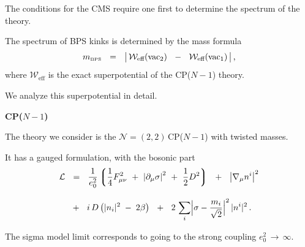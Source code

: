 \documentclass[12pt,letterpaper,landscape,KOMA,smallheadings,calcdimensions,display]{powersem}
\newcommand{\ntt}{${\mathcal N}=(2,2)\,$}
\newcommand{\cell}{{\mathcal L}}
\newcommand{\pt}{\partial}
\newcommand{\mbps}{m_{\text{\tiny BPS}}}
\newcommand{\W}{\mathcal{W}}
\newcommand{\sectionfont}{
\usefont{OT1}{lmvtt}{b}{n}\fontsize{45pt}{30pt}\selectfont
\bfseries}
\begin{document}
\begin{slide}
\vspace*{2cm}

The conditions for the CMS require one first to determine the spectrum of the theory.

The spectrum of BPS kinks is determined by the mass formula 
\[
	\mbps ~~=~~ \big|\, \W_\text{eff} ( \text{vac}_2 ) ~~-~~ \W_\text{eff} ( \text{vac}_1 ) \,\big|\,\text{,}
\]
where $ \W_\text{eff} $ is the exact superpotential of the CP($N-1$) theory.

We analyze this superpotential in detail.

\end{slide}


\begin{slide}

\vspace*{3.0cm} 
\begin{center}
\sectionfont
	CP($N-1$)
\end{center}
\vspace*{2.0cm} 


\end{slide}


\begin{slide}


\vspace*{1.0cm}
	The theory we consider is the \ntt CP($N-1$) with twisted masses.

	It has a gauged formulation, with the bosonic part
\begin{align*}
%
\cell & ~~=~~ 
	\frac{1}{e_0^2} \lgr \frac{1}{4} F_{\mu\nu}^2 ~+~ \left|\pt_\mu\sigma\right|^2 ~+~ \frac{1}{2}D^2 \rgr
 	~~+~~ \left|\nabla_\mu n^i\right|^2 
	\\[3mm]
%
&
	~~+~~ i\,D\left( |n_i|^2 \;-\; 2\beta \right)
	~~+~~ 2\,\sum_i \Bigl| \sigma-\frac{m_i}{\sqrt 2} \Bigr|^2\, |n^i|^2\,\text{.}
\end{align*}

	The sigma model limit corresponds to going to the strong coupling $ e_0^2 \,\to\, \infty $.

\end{slide}
\end{document}

